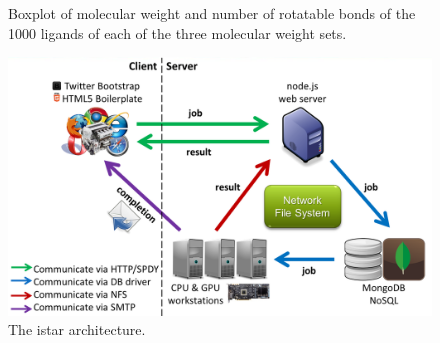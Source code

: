 \documentclass[12pt]{article}
\begin{document}
\begin{figure}
\caption{\label{MWT-NRB} Boxplot of molecular weight and number of rotatable bonds of the 1000 ligands of each of the three molecular weight sets.}
\end{figure}


\fi


\clearpage

\begin{figure}
\begin{center}
\includegraphics[width=\linewidth,keepaspectratio=true]{Architecture.png}
\caption{\label{architecture} The istar architecture.}
\end{center}
\end{figure}

\clearpage
\end{document}
